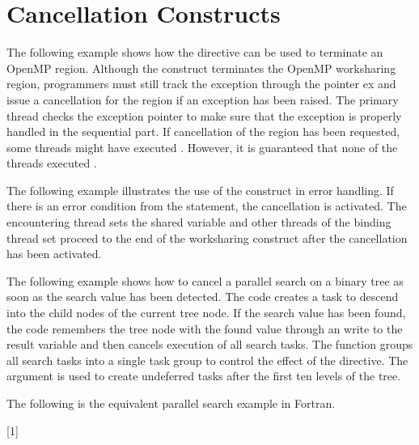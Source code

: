 \pagebreak
\section{Cancellation Constructs}
\label{sec:cancellation}

The following example shows how the  directive can be used to terminate 
an OpenMP region. Although the  construct terminates the OpenMP 
worksharing region, programmers must still track the exception through the pointer 
ex and issue a cancellation for the  region if an exception has 
been raised. The primary thread checks the exception pointer to make sure that the 
exception is properly handled in the sequential part. If cancellation of the  
region has been requested, some threads might have executed . 
However, it is guaranteed that none of the threads executed .



The following example illustrates the use of the  construct in error 
handling. If there is an error condition from the  statement, 
the cancellation is activated. The encountering thread sets the shared variable 
 and other threads of the binding thread set proceed to the end of 
the worksharing construct after the cancellation has been activated. 


\clearpage

The following example shows how to cancel a parallel search on a binary tree as 
soon as the search value has been detected. The code creates a task to descend 
into the child nodes of the current tree node. If the search value has been found, 
the code remembers the tree node with the found value through an  
write to the result variable and then cancels execution of all search tasks. The 
function  groups all search tasks into a single 
task group to control the effect of the  directive. The 
 argument is used to create undeferred tasks after the first ten 
levels of the tree.



The following is the equivalent parallel search example in Fortran.

[1]


